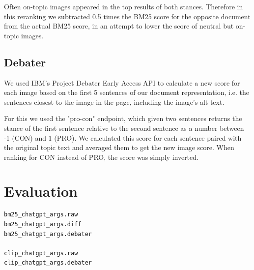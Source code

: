 \documentclass[
]{ceurart}
\begin{document}
Often on-topic images appeared in the top results of both stances. Therefore in this reranking we subtracted 0.5 times the BM25 score for the opposite document from the actual BM25 score, in an attempt to lower the score of neutral but on-topic images.

\subsection{Debater}

We used IBM's Project Debater Early Access API \cite{barhaim2021project} to calculate a new score for each image based on the first 5 sentences of our document representation, i.e. the sentences closest to the image in the page, including the image's alt text.

For this we used the "pro-con" endpoint, which given two sentences returns the stance of the first sentence relative to the second sentence as a number between -1 (CON) and 1 (PRO). We calculated this score for each sentence paired with the original topic text and averaged them to get the new image score. When ranking for CON instead of PRO, the score was simply inverted.

\section{Evaluation}

\begin{verbatim}
bm25_chatgpt_args.raw
bm25_chatgpt_args.diff
bm25_chatgpt_args.debater

clip_chatgpt_args.raw
clip_chatgpt_args.debater
\end{verbatim}


\end{document}
